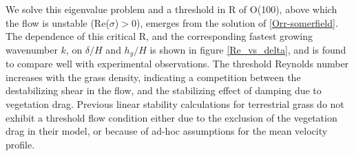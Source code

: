 \documentclass[aps,prl,twocolumn,superscriptaddress,10pt]{revtex4-1}  %
\newcommand{\hg}{h_g}
\newcommand{\Rey}{\text{R}}
\newcommand{\monami}{\textit{monami }}
\begin{document}

We solve this eigenvalue problem and a threshold in $\Rey$ of O(100), above which the flow is unstable (Re($\sigma$)$>$0), emerges from the 
solution of \eqref{Orr-somerfield}. The dependence of this critical $\Rey$, and the corresponding fastest growing wavenumber $k$, on $\delta/H$ and $\hg/H$ is shown 
in figure \ref{Re_vs_delta}, and is found to compare well with experimental observations\cite{Ghisal02}.
The threshold Reynolds number increases with the grass density, indicating a competition between the 
destabilizing shear in the flow, and the stabilizing effect of damping due to vegetation drag.
Previous linear stability calculations for terrestrial grass do not exhibit a threshold flow condition 
either due to the exclusion of the vegetation drag in their model\cite{Raupach96}, or because of ad-hoc
assumptions for the mean velocity profile\cite{Raupach96,Delangre06}.
\end{document}
